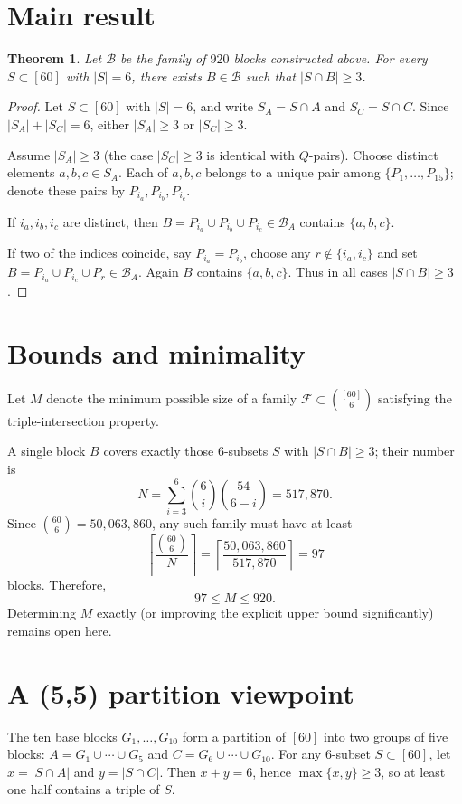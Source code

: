 \documentclass[11pt]{article}
\newtheorem{theorem}{Theorem}
\newcommand{\bb}[2]{\binom{#1}{#2}}
\begin{document}
\section{Main result}
\begin{theorem}\label{thm:main}
Let $\mathcal{B}$ be the family of $920$ blocks constructed above.
For every $S\subset[60]$ with $|S|=6$, there exists $B\in\mathcal{B}$ such that
$|S\cap B|\ge 3$.
\end{theorem}

\begin{proof}
Let $S\subset[60]$ with $|S|=6$, and write $S_A=S\cap A$ and $S_C=S\cap C$.
Since $|S_A|+|S_C|=6$, either $|S_A|\ge 3$ or $|S_C|\ge 3$.

Assume $|S_A|\ge 3$ (the case $|S_C|\ge 3$ is identical with $Q$-pairs).
Choose distinct elements $a,b,c\in S_A$.
Each of $a,b,c$ belongs to a unique pair among $\{P_1,\dots,P_{15}\}$; denote these pairs by
$P_{i_a},P_{i_b},P_{i_c}$.

If $i_a,i_b,i_c$ are distinct, then
$B=P_{i_a}\cup P_{i_b}\cup P_{i_c}\in\mathcal{B}_A$ contains $\{a,b,c\}$.

If two of the indices coincide, say $P_{i_a}=P_{i_b}$, choose any $r\notin\{i_a,i_c\}$ and set
$B=P_{i_a}\cup P_{i_c}\cup P_r\in\mathcal{B}_A$.
Again $B$ contains $\{a,b,c\}$.
Thus in all cases $|S\cap B|\ge 3$.
\end{proof}

\section{Bounds and minimality}
Let $M$ denote the minimum possible size of a family $\mathcal{F}\subset\bb{[60]}{6}$ satisfying
the triple-intersection property.

A single block $B$ covers exactly those $6$-subsets $S$ with $|S\cap B|\ge 3$; their number is
\[
N=\sum_{i=3}^{6}\bb{6}{i}\bb{54}{6-i}=517{,}870.
\]
Since $\bb{60}{6}=50{,}063{,}860$, any such family must have at least
\[
\left\lceil \frac{\bb{60}{6}}{N}\right\rceil
=
\left\lceil \frac{50{,}063{,}860}{517{,}870}\right\rceil
=97
\]
blocks. Therefore,
\[
97 \le M \le 920.
\]
Determining $M$ exactly (or improving the explicit upper bound significantly) remains open here.

\section{A (5,5) partition viewpoint}
The ten base blocks $G_1,\dots,G_{10}$ form a partition of $[60]$ into two groups of five blocks:
$A=G_1\cup\cdots\cup G_5$ and $C=G_6\cup\cdots\cup G_{10}$.
For any $6$-subset $S\subset[60]$, let $x=|S\cap A|$ and $y=|S\cap C|$.
Then $x+y=6$, hence $\max\{x,y\}\ge 3$, so at least one half contains a triple of $S$.
\end{document}
